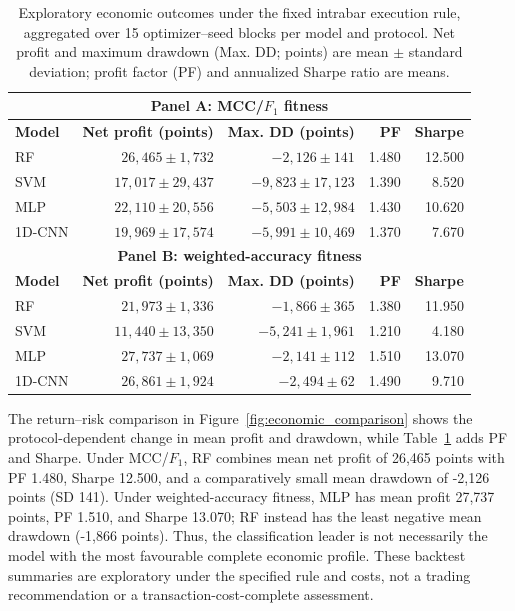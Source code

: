 \begin{table}[!htbp]
\centering
\caption{Exploratory economic outcomes under the fixed intrabar execution rule, aggregated over 15 optimizer--seed blocks per model and protocol. Net profit and maximum drawdown (Max. DD; points) are mean $\pm$ standard deviation; profit factor (PF) and annualized Sharpe ratio are means.}
\label{tab:economic_summary}
\manuscripttablestyle
\begin{tabular}{lrrrr}\toprule
\multicolumn{5}{c}{\textbf{Panel A: MCC/$F_1$ fitness}}\\\midrule
\textbf{Model} & \textbf{Net profit (points)} & \textbf{Max. DD (points)} & \textbf{PF} & \textbf{Sharpe}\\\midrule
RF & $26{,}465\pm1{,}732$ & $-2{,}126\pm141$ & 1.480 & 12.500\\
SVM & $17{,}017\pm29{,}437$ & $-9{,}823\pm17{,}123$ & 1.390 & 8.520\\
MLP & $22{,}110\pm20{,}556$ & $-5{,}503\pm12{,}984$ & 1.430 & 10.620\\
1D-CNN & $19{,}969\pm17{,}574$ & $-5{,}991\pm10{,}469$ & 1.370 & 7.670\\\midrule
\multicolumn{5}{c}{\textbf{Panel B: weighted-accuracy fitness}}\\\midrule
\textbf{Model} & \textbf{Net profit (points)} & \textbf{Max. DD (points)} & \textbf{PF} & \textbf{Sharpe}\\\midrule
RF & $21{,}973\pm1{,}336$ & $-1{,}866\pm365$ & 1.380 & 11.950\\
SVM & $11{,}440\pm13{,}350$ & $-5{,}241\pm1{,}961$ & 1.210 & 4.180\\
MLP & $27{,}737\pm1{,}069$ & $-2{,}141\pm112$ & 1.510 & 13.070\\
1D-CNN & $26{,}861\pm1{,}924$ & $-2{,}494\pm62$ & 1.490 & 9.710\\\bottomrule
\end{tabular}
\end{table}

The return--risk comparison in Figure~\ref{fig:economic_comparison} shows the protocol-dependent change in mean profit and drawdown, while Table~\ref{tab:economic_summary} adds PF and Sharpe. Under MCC/$F_1$, RF combines mean net profit of 26,465 points with PF 1.480, Sharpe 12.500, and a comparatively small mean drawdown of -2,126 points (SD 141). Under weighted-accuracy fitness, MLP has mean profit 27,737 points, PF 1.510, and Sharpe 13.070; RF instead has the least negative mean drawdown (-1,866 points). Thus, the classification leader is not necessarily the model with the most favourable complete economic profile. These backtest summaries are exploratory under the specified rule and costs, not a trading recommendation or a transaction-cost-complete assessment.


